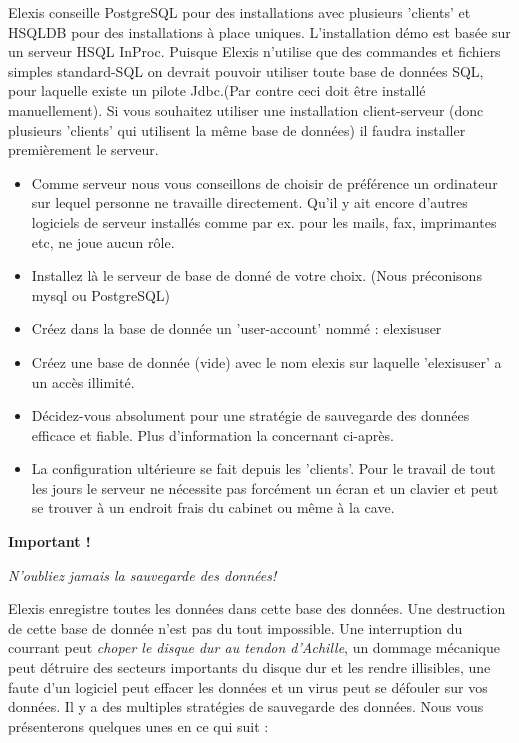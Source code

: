 Elexis conseille PostgreSQL pour des  installations avec plusieurs 'clients' et HSQLDB pour des installations à place uniques. L'installation démo est basée sur un serveur HSQL InProc. Puisque Elexis n'utilise que des commandes et fichiers simples standard-SQL on devrait pouvoir utiliser toute base de données SQL, pour laquelle existe un pilote Jdbc.(Par contre ceci doit être installé manuellement).
Si vous souhaitez utiliser une installation client-serveur (donc plusieurs 'clients' qui utilisent la même base de données) il faudra installer premièrement le serveur.
\begin{itemize}
 \item Comme serveur nous vous conseillons de choisir de préférence un ordinateur sur lequel personne ne travaille directement. Qu'il y ait encore d'autres logiciels de serveur installés comme par ex. pour les mails, fax, imprimantes etc, ne joue aucun rôle.
\item Installez là le serveur de base de donné de votre choix. (Nous préconisons mysql ou PostgreSQL)
\item Créez dans la base de donnée un 'user-account' nommé : elexisuser
\item Créez une base de donnée (vide) avec le nom elexis sur laquelle 'elexisuser' a un accès illimité.
\item Décidez-vous absolument pour une stratégie de sauvegarde des données efficace et fiable. Plus d'information la concernant ci-après.
\item La configuration ultérieure se fait depuis les 'clients'. Pour le travail de tout les jours le serveur ne nécessite pas forcément un écran et un clavier et peut se trouver à un endroit frais du cabinet ou même à la cave.
\end{itemize}

\textbf{Important !}

\textit{N'oubliez jamais la sauvegarde des données! }

Elexis enregistre toutes les données dans cette base des données. Une destruction de cette base de donnée n'est pas du tout impossible. Une interruption du courrant peut  \textit{choper le disque dur au tendon d'Achille}, un dommage mécanique peut détruire des secteurs importants du disque dur et les rendre illisibles, une faute d'un logiciel peut effacer les données et un virus peut se défouler sur vos données. Il y a des multiples stratégies de sauvegarde des données. Nous vous présenterons quelques unes en ce qui suit :

